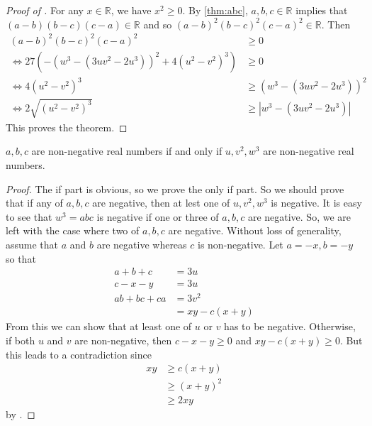 \documentclass{subfile}
\begin{document}
		\begin{proof}[Proof of ]
			For any $x\in\mathbb{R}$, we have $x^{2}\geq 0$. By \eqref{thm:abc}, $a,b,c\in\mathbb{R}$ implies that $(a-b)(b-c)(c-a)\in\mathbb{R}$ and so $(a-b)^{2}(b-c)^{2}(c-a)^{2}\in\mathbb{R}$. Then
				\begin{align*}
					(a-b)^{2}(b-c)^{2}(c-a)^{2}
						& \geq 0\\
					\iff 27\left(-(w^{3}-(3uv^{2}-2u^{3}))^{2}+4(u^{2}-v^{2})^{3}\right)
						& \geq 0\\
					\iff 4(u^{2}-v^{2})^{3}
						& \geq (w^{3}-(3uv^{2}-2u^{3}))^{2}\\
					\iff 2\sqrt{(u^{2}-v^{2})^{3}}
						& \geq \left|w^{3}-(3uv^{2}-2u^{3})\right|
				\end{align*}
			This proves the theorem.
		\end{proof}

		\begin{theorem}\label{thm:positivity}
			$a,b,c$ are non-negative real numbers if and only if $u,v^{2},w^{3}$ are non-negative real numbers.
		\end{theorem}

		\begin{proof}
			The if part is obvious, so we prove the only if part. So we should prove that if any of $a,b,c$ are negative, then at lest one of $u,v^{2},w^{3}$ is negative. It is easy to see that $w^{3}=abc$ is negative if one or three of $a,b,c$ are negative. So, we are left with the case where two of $a,b,c$ are negative. Without loss of generality, assume that $a$ and $b$ are negative whereas $c$ is non-negative. Let $a=-x,b=-y$ so that
				\begin{align*}
					a+b+c
						& = 3u\\
					c-x-y
						& = 3u\\
					ab+bc+ca
						& = 3v^{2}\\
						& = xy-c(x+y)
				\end{align*}
			From this we can show that at least one of $u$ or $v$ has to be negative. Otherwise, if both $u$ and $v$ are non-negative, then $c-x-y\geq 0$ and $xy-c(x+y)\geq 0$. But this leads to a contradiction since
				\begin{align*}
					xy
						& \geq c(x+y)\\
						& \geq (x+y)^{2}\\
						& \geq 2xy
				\end{align*}
			by .
		\end{proof}
\end{document}

